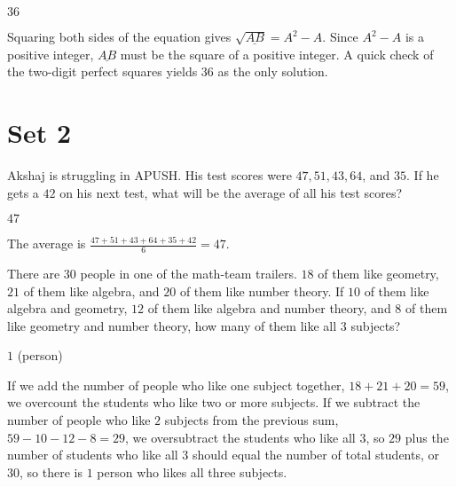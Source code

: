 \documentclass[11pt]{article}
\begin{document}
\begin{answer}
$\boxed{36}$
\end{answer}

\begin{solution}
Squaring both sides of the equation gives $\sqrt{\underline{AB}} = A^2 - A$. Since $A^2 - A$ is a positive integer, $\underline{AB}$ must be the square of a positive integer. A quick check of the two-digit perfect squares yields $\boxed{36}$ as the only solution.
\end{solution}

\newpage

\section*{Set 2}

\begin{problem}%
Akshaj is struggling in APUSH. His test scores were $47, 51, 43, 64$, and $35$. If he gets a $42$ on his next test, what will be the average of all his test scores?
\end{problem}

\begin{answer}
$\boxed{47}$
\end{answer}

\begin{solution}
The average is $\frac{47 + 51 + 43 + 64 + 35 + 42}{6} = \boxed{47}$.
\end{solution}


\begin{problem}%
There are $30$ people in one of the math-team trailers. $18$ of them like geometry, $21$ of them like algebra, and $20$ of them like number theory. If $10$ of them like algebra and geometry, $12$ of them like algebra and number theory, and $8$ of them like geometry and number theory, how many of them like all $3$ subjects?
\end{problem}

\begin{answer}
$\boxed{1}$ (person)
\end{answer}

\begin{solution}
If we add the number of people who like one subject together, $18 + 21 + 20 = 59$, we overcount the students who like two or more subjects. If we subtract the number of people who like $2$ subjects from the previous sum, $59 - 10 - 12 - 8 = 29$, we oversubtract the students who like all $3$, so $29$ plus the number of students who like all $3$ should equal the number of total students, or $30$, so there is $\boxed{1}$ person who likes all three subjects.
\end{solution}
\end{document}
